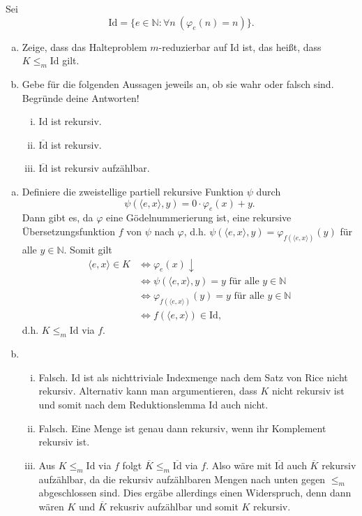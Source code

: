 \documentclass[german,headsepline]{scrartcl}
\theoremstyle{definition}
\begin{document}
	\begin{question}[subtitle={Klausur 2012}]
		Sei
		\[\text{Id}=\{e\in\mathbb{N}\colon\forall n~(\varphi_e(n)=n)\}.\]
		\begin{enumerate}[(a)]
			\item Zeige, dass das Halteproblem $m$-reduzierbar auf Id ist, das heißt, dass $K\leq_m\text{Id}$ gilt.
			\item Gebe für die folgenden Aussagen jeweils an, ob sie wahr oder falsch sind. Begründe deine Antworten!
				\begin{enumerate}[(i)]
					\item Id ist rekursiv.
					\item $\overline{\text{Id}}$ ist rekursiv.
					\item $\overline{\text{Id}}$ ist rekursiv aufzählbar.
				\end{enumerate}
		\end{enumerate}
	\end{question}
	\begin{solution}
		\begin{enumerate}[(a)]
			\item Definiere die zweistellige partiell rekursive Funktion $\psi$ durch
				\[\psi(\langle e,x\rangle,y)=0\cdot\varphi_e(x)+y.\]
				Dann gibt es, da $\varphi$ eine Gödelnummerierung ist,
				eine rekursive Übersetzungsfunktion $f$ von $\psi$ nach $\varphi$,
				d.h. $\psi(\langle e,x\rangle,y)=\varphi_{f(\langle e,x\rangle)}(y)$ für alle $y\in\mathbb{N}$.
				Somit gilt
				\begin{align*}
					\langle e,x\rangle\in K &\Leftrightarrow \varphi_e(x)\downarrow \\
					&\Leftrightarrow \psi(\langle e,x\rangle,y)=y\text{ für alle }y\in\mathbb{N} \\
					&\Leftrightarrow \varphi_{f(\langle e,x\rangle)}(y)=y\text{ für alle }y\in\mathbb{N} \\
					&\Leftrightarrow f(\langle e,x\rangle)\in\text{Id},
				\end{align*}
				d.h. $K\leq_m\text{Id}$ via $f$.
			\item \begin{enumerate}[(i)]
				\item Falsch. Id ist als nichttriviale Indexmenge nach dem Satz von Rice nicht rekursiv.
					Alternativ kann man argumentieren, dass $K$ nicht rekursiv ist und somit nach dem Reduktionslemma Id auch nicht.
				\item Falsch. Eine Menge ist genau dann rekursiv, wenn ihr Komplement rekursiv ist.
				\item Aus $K\leq_m\text{Id}$ via $f$ folgt $\overline{K}\leq_m\overline{\text{Id}}$ via $f$.
					Also wäre mit $\overline{\text{Id}}$ auch $\overline{K}$ rekursiv aufzählbar,
					da die rekursiv aufzählbaren Mengen nach unten gegen $\leq_m$ abgeschlossen sind.
					Dies ergäbe allerdings einen Widerspruch,
					denn dann wären $K$ und $\overline{K}$ rekusriv aufzählbar und somit $K$ rekursiv.
			\end{enumerate}
		\end{enumerate}
	\end{solution}
	
\end{document}
